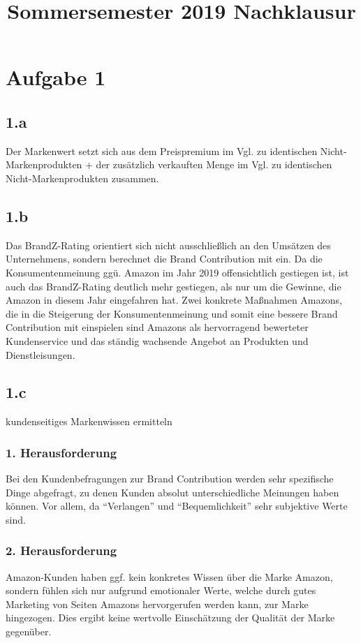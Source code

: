 \documentclass{article}
\title{Sommersemester 2019 Nachklausur}
\begin{document}
\maketitle


\section{Aufgabe 1}
\subsection{1.a}
Der Markenwert setzt sich aus dem Preispremium im Vgl. zu identischen Nicht-Markenprodukten + der zusätzlich verkauften Menge im Vgl. zu identischen Nicht-Markenprodukten zusammen.  

\subsection{1.b}
Das BrandZ-Rating orientiert sich nicht ausschließlich an den Umsätzen des Unternehmens, sondern berechnet die Brand Contribution mit ein. Da die Konsumentenmeinung ggü. Amazon im Jahr 2019 offensichtlich gestiegen ist, ist auch das BrandZ-Rating deutlich mehr gestiegen, als nur um die Gewinne, die Amazon in diesem Jahr eingefahren hat.
Zwei konkrete Maßnahmen Amazons, die in die Steigerung der Konsumentenmeinung und somit eine bessere Brand Contribution mit einspielen sind Amazons als hervorragend bewerteter Kundenservice und das ständig wachsende Angebot an Produkten und Dienstleisungen.

\subsection{1.c} kundenseitiges Markenwissen ermitteln
\subsubsection{1. Herausforderung}
Bei den Kundenbefragungen zur Brand Contribution werden sehr spezifische Dinge abgefragt, zu denen Kunden absolut unterschiedliche Meinungen haben können. Vor allem, da "`Verlangen"' und "`Bequemlichkeit"' sehr subjektive Werte sind.
\subsubsection{2. Herausforderung}
Amazon-Kunden haben ggf. kein konkretes Wissen über die Marke Amazon, sondern fühlen sich nur aufgrund emotionaler Werte, welche durch gutes Marketing von Seiten Amazons hervorgerufen werden kann, zur Marke hingezogen. Dies ergibt keine wertvolle Einschätzung der Qualität der Marke gegenüber.
\end{document}
